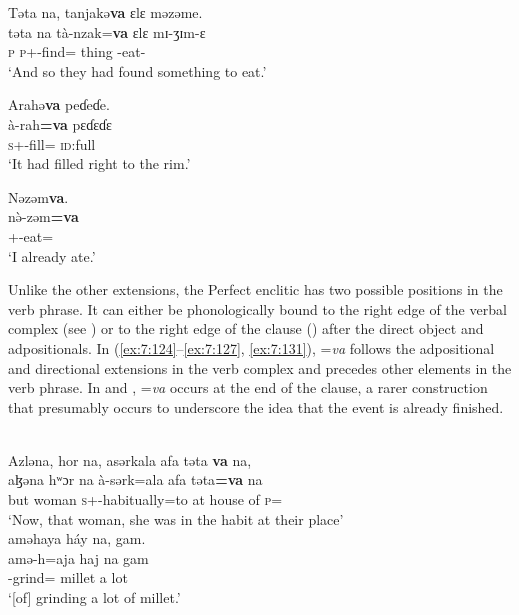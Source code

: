 \ea\label{ex:7:126}
Təta  na,  tanjakə\textbf{va}  ɛlɛ  məzəme.\\
\gll  təta    na  tà-nzak=\textbf{va}  ɛlɛ  mɪ-ʒɪm-ɛ\\
      \textsc{p}    {\PSP}  \textsc{p}+{\PFV}-find={\PRF}  thing  {\NOM}{}-eat-{\CL}\\
\glt  ‘And so they had found something to eat.’\\
\z 

\ea\label{ex:7:127}
Arahə\textbf{va}  peɗeɗe.\\
\gll  à-rah\textbf{=va}    pɛɗɛɗɛ\\
      \textsc{s}+{\PFV}-fill={\PRF}  \textsc{id}:full\\
\glt  ‘It had filled right to the rim.’\\
\z 

\ea\label{ex:7:128}
Nəzəm\textbf{va}.\\
\gll  n\`ə-zəm\textbf{=va}\\
      {\oneS}+{\PFV}-eat={\PRF}\\
\glt  ‘I already ate.’\\
\z 

Unlike the other extensions, the Perfect\textit{ }enclitic has two possible positions in the verb phrase. It can either be phonologically bound to the right edge of the verbal complex (see ) or to the right edge of the clause () after the direct object and adpositionals. In (\ref{ex:7:124}--\ref{ex:7:127}, \ref{ex:7:131}), =\textit{va} follows the adpositional and directional extensions in the verb complex and precedes other elements in the verb phrase. In  and , =\textit{va} occurs at the end of the clause, a rarer construction that presumably occurs to underscore the idea that the event is already finished.

\clearpage
\ea\label{ex:7:129}\\
Azləna,  hor  na,  asərkala  afa  təta \textbf{va}  na,  \\
\gll  aɮəna  hʷɔr     na  à-sərk=ala  afa  təta\textbf{=va} na\\ 
      but  woman  {\PSP}  \textsc{s}+{\PFV}-{habitually}=to  {at house of}  \textsc{p}={\PRF} {\PSP} \\  
\glt ‘Now, that woman, she was in the habit at their place’\\
      
      \medskip
aməhaya  háy  na,  gam.\\
\gll amə-h=aja haj na gam\\
     {\DEP}-grind={\PLU}  millet  {\PSP}    {a lot}\\
\glt  ‘[of] grinding a lot of millet.’\\
\z 


